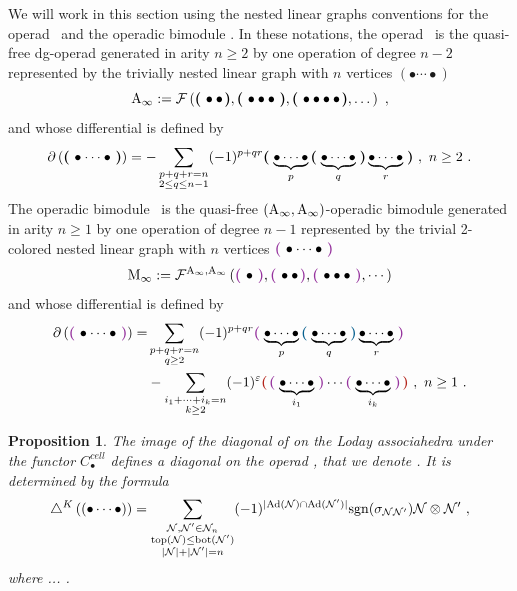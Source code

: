 \documentclass[twoside, 12pt]{amsart}
\newtheorem{proposition}[definition]{Proposition}
\theoremstyle{remark}
\begin{document}
We will work in this section using the nested linear graphs conventions for the operad \Ainf\ and the operadic bimodule \Minf . In these notations, the operad \Ainf\ is the quasi-free dg-operad generated in arity $n \geq 2$ by one operation of degree $n-2$ represented by the trivially nested linear graph with $n$ vertices $(\bullet \cdots \bullet )$ 
\[ \mathrm{A}_\infty := \mathcal{F} \left( \boldsymbol{\left(\right.}  \bullet \bullet  \boldsymbol{\left.\right)} , \boldsymbol{\left(\right.}  \bullet \bullet \bullet  \boldsymbol{\left.\right)} ,  \boldsymbol{\left(\right.}  \bullet \bullet \bullet \bullet  \boldsymbol{\left.\right)} , \dots  \right) \ , \]
and whose differential is defined by
\[ \partial \left( \boldsymbol{\left(\right.}  \bullet \cdots \bullet  \boldsymbol{\left.\right)} \right) = - \sum_{\substack{p+q+r=n \\ 2 \leq q \leq n-1}} (-1)^{p+qr} \boldsymbol{\left(\right.}  \underbrace{\bullet \cdots \bullet}_p \boldsymbol{\left(\right.}  \underbrace{\bullet \cdots \bullet}_q  \boldsymbol{\left.\right)} \underbrace{\bullet \cdots \bullet}_r  \boldsymbol{\left.\right)} \ , \ n\geq 2 \ . \]
The operadic bimodule \Minf\ is the quasi-free $(\mathrm{A}_\infty , \mathrm{A}_\infty)$-operadic bimodule generated in arity $n \geq 1$ by one operation of degree $n-1$ represented by the trivial 2-colored nested linear graph with $n$ vertices $\purple{\bullet \cdots \bullet}$
\[ \Minf := \mathcal{F}^{\Ainf , \Ainf} \left( \purple{\bullet} , \purple{\bullet \bullet} , \purple{\bullet \bullet \bullet} , \cdots \right)\]
and whose differential is defined by
\begin{align*}
\partial \left( \purple{\bullet \cdots \bullet} \right) =& \sum_{\substack{p+q+r=n \\ q \geq 2}} (-1)^{p+qr} \purple{\underbrace{\bullet \cdots \bullet}_p \blue{\underbrace{\bullet \cdots \bullet}_q} \underbrace{\bullet \cdots \bullet}_r} \\
&-  \sum_{\substack{i_1+\cdots+i_k=n \\ k \geq 2}} (-1)^{\varepsilon} \red{\purple{\underbrace{\bullet \cdots \bullet}_{i_1}} \cdots \purple{\underbrace{\bullet \cdots \bullet}_{i_k}}} \ , \ n \geq 1 \ .
\end{align*} 


\begin{proposition}
\label{prop:diagonal-polytopale-a-infini}
The image of the diagonal of \cite{MTTV19} on the Loday associahedra under the functor $C_\bullet^{cell}$ defines a diagonal on the operad \Ainf , that we denote \diagainf . It is determined by the formula 
\[ \triangle^{K} \left( (\bullet \cdots \bullet) \right) = 
\sum_{\substack{
  \mathcal{N},\mathcal{N}' \in \mathcal{N}_n \\ 
  \operatorname{top}(\mathcal{N}) \leq \operatorname{bot}(\mathcal{N'}) \\
  |\mathcal{N}|+|\mathcal{N}'|=n
}}
(-1)^{|\mathrm{Ad}(\mathcal{N})\cap \mathrm{Ad}(\mathcal{N}')|}\mathrm{sgn}(\sigma_{\mathcal{N}\mathcal{N}'})\mathcal{N} \otimes \mathcal{N}' \ , \] 
where ... . 
\end{proposition}
\end{document}
